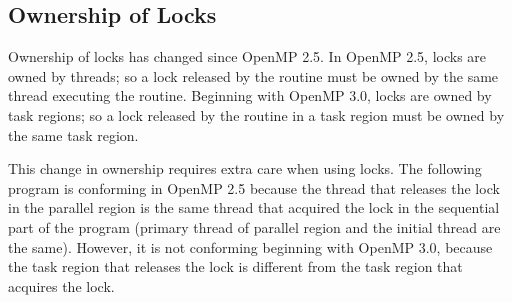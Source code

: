 \subsection{Ownership of Locks}
\label{subsec:lock_owner}

Ownership of locks has changed since OpenMP 2.5. In OpenMP 2.5, locks are owned 
by threads; so a lock released by the  routine must be 
owned by the same thread executing the routine.  Beginning with OpenMP 3.0, locks are owned 
by task regions; so a lock released by the  routine in 
a task region must be owned by the same task region.

This change in ownership requires extra care when using locks. The following program 
is conforming in OpenMP 2.5 because the thread that releases the lock  
in the parallel region is the same thread that acquired the lock in the sequential 
part of the program (primary thread of parallel region and the initial thread are 
the same). However, it is not conforming beginning with OpenMP 3.0, because the task 
region that releases the lock  is different from the task region that 
acquires the lock.




